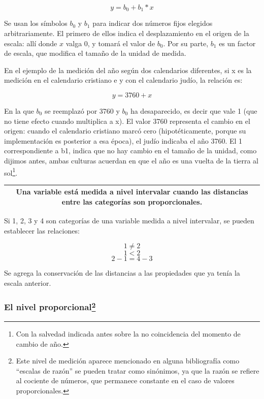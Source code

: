 \documentclass[]{book}
\let\rmarkdownfootnote\footnote%
\def\footnote{\protect\rmarkdownfootnote}
\begin{document}
\[y = b_0 + b_1*x\]

Se usan los símbolos \(b_0\) y \(b_1\) para indicar dos números fijos elegidos arbitrariamente. El primero de ellos indica el desplazamiento en el origen de la escala: allí donde \(x\) valga 0, y tomará el valor de \(b_0\). Por su parte, \(b_1\) es un factor de escala, que modifica el tamaño de la unidad de medida.

En el ejemplo de la medición del año según dos calendarios diferentes, si x es la medición en el calendario cristiano e y con el calendario judío, la relación es:

\[y = 3760 + x\]

En la que \(b_0\) se reemplazó por 3760 y \(b_0\) ha desaparecido, es decir que vale 1 (que no tiene efecto cuando multiplica a x). El valor 3760 representa el cambio en el origen: cuando el calendario cristiano marcó cero (hipotéticamente, porque su implementación es posterior a esa época), el judío indicaba el año 3760. El 1 correspondiente a b1, indica que no hay cambio en el tamaño de la unidad, como dijimos antes, ambas culturas acuerdan en que el año es una vuelta de la tierra al sol\footnote{Con la salvedad indicada antes sobre la no coincidencia del momento de cambio de año.}.

\begin{longtable}[]{@{}c@{}}
\toprule
\endhead
\begin{minipage}[t]{0.97\columnwidth}\centering
Una variable está medida a nivel \textbf{intervalar} cuando las distancias entre las categorías son proporcionales.\strut
\end{minipage}\tabularnewline
\bottomrule
\end{longtable}

Si 1, 2, 3 y 4 son categorías de una variable medida a nivel intervalar, se pueden establecer las relaciones:

\[1 \neq 2\]
\[1 < 2\]
\[2 - 1 = 4 - 3\]

Se agrega la conservación de las distancias a las propiedades que ya tenía la escala anterior.

\hypertarget{el-nivel-proporcionalescalas_de_razon}{%
\subsubsection[El nivel proporcional]{\texorpdfstring{El nivel proporcional\footnote{Este nivel de medición aparece mencionado en alguna bibliografía como ``escalas de razón'' se pueden tratar como sinónimos, ya que la razón se refiere al cociente de números, que permanece constante en el caso de valores proporcionales.}}{El nivel proporcional}}\label{el-nivel-proporcionalescalas_de_razon}}
\end{document}

